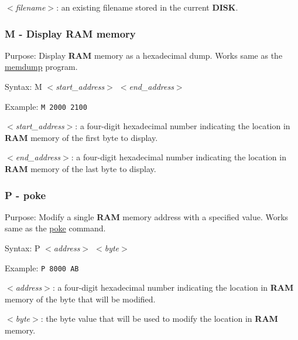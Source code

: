         \hspace{1cm}\textit{$<$filename$>$}: an existing filename stored in the
        current \textbf{DISK}.

        \subsubsection{M - Display RAM memory}

        Purpose: Display \textbf{RAM} memory as a hexadecimal dump. Works same
        as the \hyperref[software:memdump]{memdump} program.

        Syntax: M \textit{$<$start\_address$>$ $<$end\_address$>$}

        Example: \texttt{M 2000 2100}

        \hspace{1cm}\textit{$<$start\_address$>$}: a four-digit hexadecimal
        number indicating the location in \textbf{RAM} memory of the first byte
        to display.

        \hspace{1cm}\textit{$<$end\_address$>$}: a four-digit hexadecimal
        number indicating the location in \textbf{RAM} memory of the last byte
        to display.

        \subsubsection{P - poke}

        Purpose: Modify a single \textbf{RAM} memory address with a specified
        value. Works same as the \hyperref[cmd:poke]{poke} command.

        Syntax: P \textit{$<$address$>$ $<$byte$>$}

        Example: \texttt{P 8000 AB}

        \hspace{1cm}\textit{$<$address$>$}: a four-digit hexadecimal number
        indicating the location in \textbf{RAM} memory of the byte that will be
        modified.

        \hspace{1cm}\textit{$<$byte$>$}: the byte value that will be used to
        modify the location in \textbf{RAM} memory.


